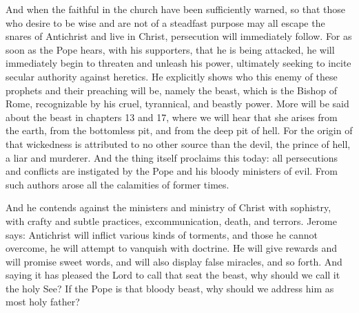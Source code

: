And when the faithful in the church have been sufficiently warned, so that those who desire to be wise and are not of a steadfast purpose may all escape the snares of Antichrist and live in Christ, persecution will immediately follow. For as soon as the Pope hears, with his supporters, that he is being attacked, he will immediately begin to threaten and unleash his power, ultimately seeking to incite secular authority against heretics. He explicitly shows who this enemy of these prophets and their preaching will be, namely the beast, which is the Bishop of Rome, recognizable by his cruel, tyrannical, and beastly power. More will be said about the beast in chapters 13 and 17, where we will hear that she arises from the earth, from the bottomless pit, and from the deep pit of hell. For the origin of that wickedness is attributed to no other source than the devil, the prince of hell, a liar and murderer. And the thing itself proclaims this today: all persecutions and conflicts are instigated by the Pope and his bloody ministers of evil. From such authors arose all the calamities of former times.

And he contends against the ministers and ministry of Christ with sophistry, with crafty and subtle practices, excommunication, death, and terrors. Jerome says: Antichrist will inflict various kinds of torments, and those he cannot overcome, he will attempt to vanquish with doctrine. He will give rewards and will promise sweet words, and will also display false miracles, and so forth. And saying it has pleased the Lord to call that seat the beast, why should we call it the holy See? If the Pope is that bloody beast, why should we address him as most holy father?

